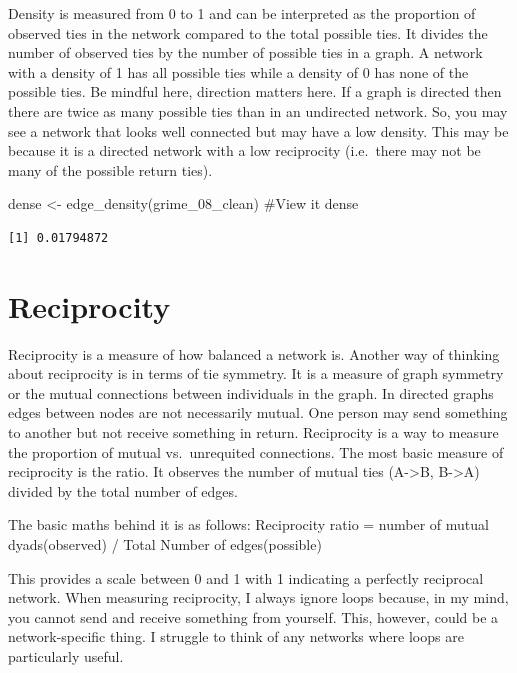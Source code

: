 \documentclass[
  letterpaper,
  DIV=11,
  numbers=noendperiod]{scrreprt}
\newenvironment{Shaded}{\begin{snugshade}}{\end{snugshade}}
\newcommand{\CommentTok}[1]{\textcolor[rgb]{0.37,0.37,0.37}{#1}}
\newcommand{\FunctionTok}[1]{\textcolor[rgb]{0.28,0.35,0.67}{#1}}
\newcommand{\NormalTok}[1]{\textcolor[rgb]{0.00,0.23,0.31}{#1}}
\newcommand{\OtherTok}[1]{\textcolor[rgb]{0.00,0.23,0.31}{#1}}
\begin{document}
Density is measured from 0 to 1 and can be interpreted as the proportion
of observed ties in the network compared to the total possible ties. It
divides the number of observed ties by the number of possible ties in a
graph. A network with a density of 1 has all possible ties while a
density of 0 has none of the possible ties. Be mindful here, direction
matters here. If a graph is directed then there are twice as many
possible ties than in an undirected network. So, you may see a network
that looks well connected but may have a low density. This may be
because it is a directed network with a low reciprocity (i.e.~there may
not be many of the possible return ties).

\begin{Shaded}
\begin{Highlighting}[]
\NormalTok{  dense }\OtherTok{\textless{}{-}} \FunctionTok{edge\_density}\NormalTok{(grime\_08\_clean)}
\CommentTok{\#View it}
\NormalTok{dense}
\end{Highlighting}
\end{Shaded}

\begin{verbatim}
[1] 0.01794872
\end{verbatim}

\section{Reciprocity}\label{reciprocity}

Reciprocity is a measure of how balanced a network is. Another way of
thinking about reciprocity is in terms of tie symmetry. It is a measure
of graph symmetry or the mutual connections between individuals in the
graph. In directed graphs edges between nodes are not necessarily
mutual. One person may send something to another but not receive
something in return. Reciprocity is a way to measure the proportion of
mutual vs.~unrequited connections. The most basic measure of reciprocity
is the ratio. It observes the number of mutual ties (A-\textgreater B,
B-\textgreater A) divided by the total number of edges.

The basic maths behind it is as follows: Reciprocity ratio = number of
mutual dyads(observed) / Total Number of edges(possible)

This provides a scale between 0 and 1 with 1 indicating a perfectly
reciprocal network. When measuring reciprocity, I always ignore loops
because, in my mind, you cannot send and receive something from
yourself. This, however, could be a network-specific thing. I struggle
to think of any networks where loops are particularly useful.
\end{document}
